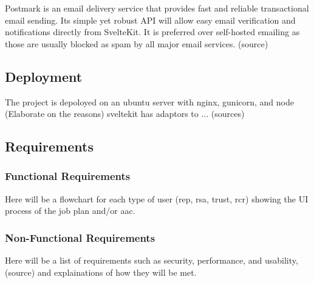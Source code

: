 \begin{multicols}{2}
Postmark is an email delivery service that provides fast and reliable transactional email sending. Its simple yet robust API will allow easy email verification and notifications directly from SvelteKit. It is preferred over self-hosted emailing as those are usually blocked as spam by all major email services. (source)

\subsection{Deployment}
The project is depoloyed on an ubuntu server with nginx, gunicorn, and node (Elaborate on the reasons) sveltekit has adaptors to ... (sources)

\subsection{Requirements}
\subsubsection{Functional Requirements}
Here will be a flowchart for each type of user (rep, rsa, trust, rcr) showing the UI process of the job plan and/or aac. 

\subsubsection{Non-Functional Requirements}
Here will be a list of requirements such as security, performance, and usability, (source) and explainations of how they will be met.

\end{multicols}